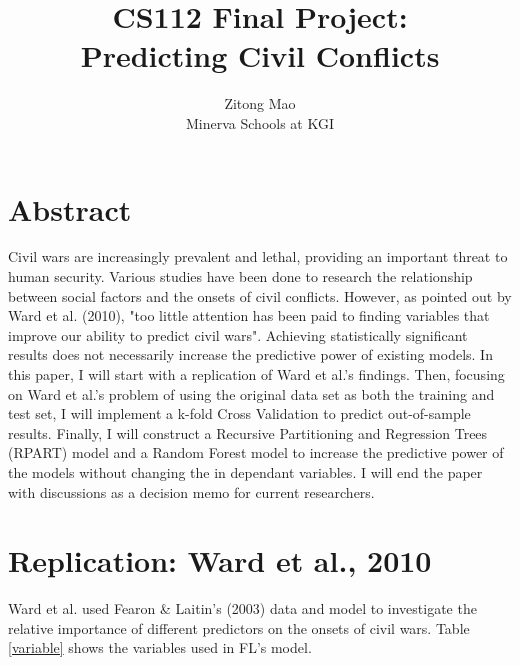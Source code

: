 \documentclass{article}
\title{CS112 Final Project: \\ Predicting Civil Conflicts}
\author{Zitong Mao \\ Minerva Schools at KGI}
\begin{document}
\maketitle

\section{Abstract}
Civil wars are increasingly prevalent and lethal, providing an important threat to human security. Various studies have been done to research the relationship between social factors and the onsets of civil conflicts. However, as pointed out by Ward et al. (2010), "too little attention has been paid to finding variables that improve our ability to predict civil wars". Achieving statistically significant results does not necessarily increase the predictive power of existing models. In this paper, I will start with a replication of Ward et al.'s findings. Then, focusing on Ward et al.'s problem of using the original data set as both the training and test set, I will implement a k-fold Cross Validation to predict out-of-sample results. Finally, I will construct a Recursive Partitioning and Regression Trees (RPART) model and a Random Forest model to increase the predictive power of the models without changing the in dependant variables. I will end the paper with discussions as a decision memo for current researchers.

\section{Replication: Ward et al., 2010}

Ward et al. used Fearon \& Laitin's (2003) data and model to investigate the relative importance of different predictors on the onsets of civil wars. Table \ref{variable} shows the variables used in FL's model.
\end{document}
